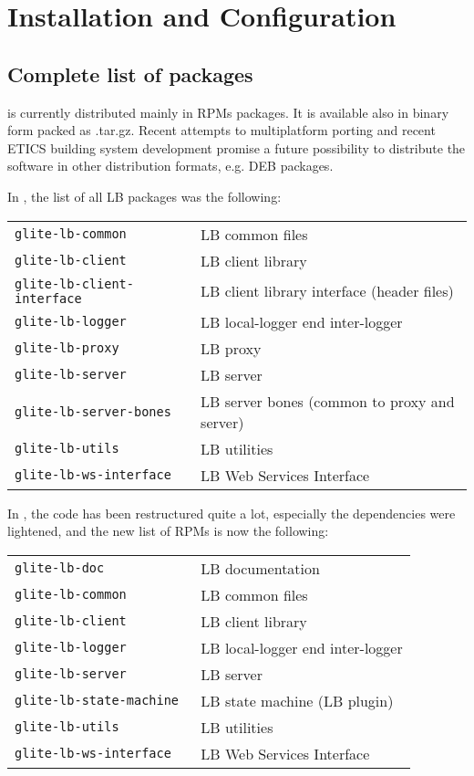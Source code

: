 \section{Installation and Configuration}

\subsection{Complete list of packages}

\LB is currently distributed mainly in RPMs packages. It is available also in
binary form packed as .tar.gz. Recent attempts to multiplatform porting and
recent ETICS building system development promise a future possibility to
distribute the software in other distribution formats, e.g. DEB packages. 

In \LBold, the list of all LB packages was the following:

\begin{tabularx}{\textwidth}{>{\tt}lX}
glite-lb-common & LB common files \\ 
glite-lb-client & LB client library \\ 
glite-lb-client-interface & LB client library interface (header files) \\ 
glite-lb-logger & LB local-logger end inter-logger \\ 
glite-lb-proxy & LB proxy \\ 
glite-lb-server & LB server \\ 
glite-lb-server-bones & LB server bones (common to proxy and server) \\ 
glite-lb-utils & LB utilities \\ 
glite-lb-ws-interface & LB Web Services Interface 
\end{tabularx}

In \LBnew, the code has been restructured quite a lot, especially the dependencies were lightened,
and the new list of RPMs is now the following:

\begin{tabularx}{\textwidth}{>{\tt}lX}
glite-lb-doc & LB documentation \\ 
glite-lb-common & LB common files \\ 
glite-lb-client & LB client library \\ 
glite-lb-logger & LB local-logger end inter-logger \\
glite-lb-server & LB server \\
glite-lb-state-machine & LB state machine (LB plugin) \\ 
glite-lb-utils & LB utilities \\
glite-lb-ws-interface & LB Web Services Interface      
\end{tabularx}

